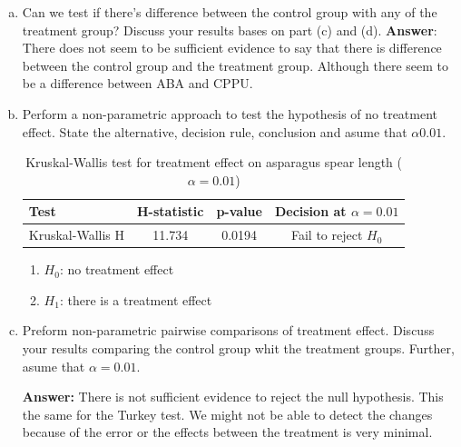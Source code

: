 \documentclass{article}
\begin{document}
\begin{enumerate}[(a)]
	\item Can we test if there's difference between the control group with any of the treatment group? Discuss your results bases on part (c) and (d).
	      \textbf{Answer}: There does not seem to be sufficient evidence to say that there is difference between the control group and the treatment group.
	      Although there seem to be a difference between ABA and CPPU.
	\item Perform a non-parametric approach to test the hypothesis of no treatment effect. State the alternative, decision rule, conclusion and asume that $\alpha 0.01$.
	      \begin{table}[h!]
		      \centering
		      \caption{Kruskal-Wallis test for treatment effect on asparagus spear length (\(\alpha = 0.01\))}
		      \begin{tabular}{l c c c}
			      \hline
			      \textbf{Test}    & \textbf{H-statistic} & \textbf{p-value} & \textbf{Decision at \(\alpha = 0.01\)} \\
			      \hline
			      Kruskal-Wallis H & 11.734               & 0.0194           & Fail to reject \(H_0\)                 \\
			      \hline
		      \end{tabular}
	      \end{table}
	      \begin{enumerate}
		      \item $H_0$: no treatment effect
		      \item $H_1$: there is a treatment effect
	      \end{enumerate}

	\item Preform non-parametric pairwise comparisons of treatment effect. Discuss your results comparing the control group whit the treatment groups.
	      Further, asume that $\alpha = 0.01$.

	      \textbf{Answer:} There is not sufficient evidence to reject the null hypothesis. This the same for the Turkey test. We might not be able to detect the changes
	      because of the error or the effects between the treatment is very minimal.
\end{enumerate}
\end{document}
